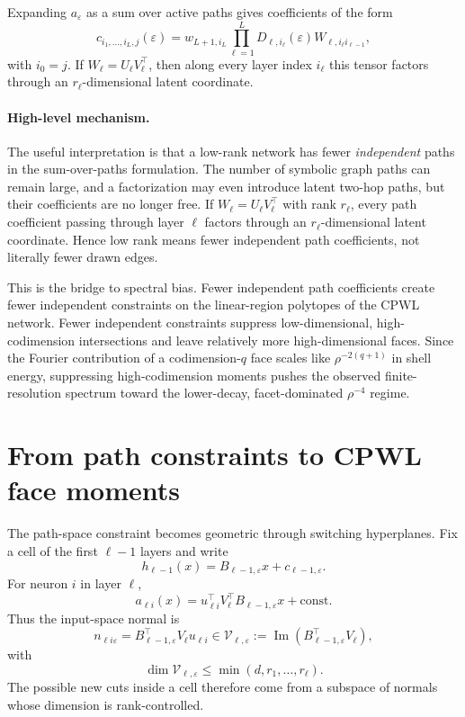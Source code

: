 \documentclass[10pt,twocolumn]{article}
\newcommand{\1}{\mathbf{1}}
\newcommand{\im}{\operatorname{Im}}
\newcommand{\cV}{\mathcal{V}}
\begin{document}
Expanding $a_\varepsilon$ as a sum over active paths gives coefficients of the form
\begin{equation}
 c_{i_1,\ldots,i_L,j}(\varepsilon)=w_{L+1,i_L}\prod_{\ell=1}^L D_{\ell,i_\ell}(\varepsilon) W_{\ell,i_\ell i_{\ell-1}},
\end{equation}
with $i_0=j$.  If $W_\ell=U_\ell V_\ell^\top$, then along every layer index $i_\ell$ this tensor factors through an $r_\ell$-dimensional latent coordinate.

\paragraph{High-level mechanism.}
The useful interpretation is that a low-rank network has fewer \emph{independent} paths in the sum-over-paths formulation.  The number of symbolic graph paths can remain large, and a factorization may even introduce latent two-hop paths, but their coefficients are no longer free.  If $W_\ell=U_\ell V_\ell^\top$ with rank $r_\ell$, every path coefficient passing through layer $\ell$ factors through an $r_\ell$-dimensional latent coordinate.  Hence low rank means fewer independent path coefficients, not literally fewer drawn edges.

This is the bridge to spectral bias.  Fewer independent path coefficients create fewer independent constraints on the linear-region polytopes of the CPWL network.  Fewer independent constraints suppress low-dimensional, high-codimension intersections and leave relatively more high-dimensional faces.  Since the Fourier contribution of a codimension-$q$ face scales like $\rho^{-2(q+1)}$ in shell energy, suppressing high-codimension moments pushes the observed finite-resolution spectrum toward the lower-decay, facet-dominated $\rho^{-4}$ regime.

\section{From path constraints to CPWL face moments}
The path-space constraint becomes geometric through switching hyperplanes.  Fix a cell of the first $\ell-1$ layers and write
\begin{equation}
 h_{\ell-1}(x)=B_{\ell-1,\varepsilon}x+c_{\ell-1,\varepsilon}.
\end{equation}
For neuron $i$ in layer $\ell$,
\begin{equation}
 a_{\ell i}(x)=u_{\ell i}^\top V_\ell^\top B_{\ell-1,\varepsilon}x+\mathrm{const.}
\end{equation}
Thus the input-space normal is
\begin{equation}
 n_{\ell i\varepsilon}=B_{\ell-1,\varepsilon}^\top V_\ell u_{\ell i}
 \in \cV_{\ell,\varepsilon}:=\im(B_{\ell-1,\varepsilon}^\top V_\ell),
\end{equation}
with
\begin{equation}
 \dim \cV_{\ell,\varepsilon}\le \min(d,r_1,\ldots,r_\ell).
\end{equation}
The possible new cuts inside a cell therefore come from a subspace of normals whose dimension is rank-controlled.
\end{document}
